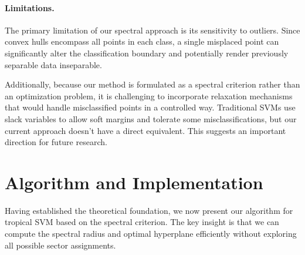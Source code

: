 \documentclass{article}
\begin{document}
\paragraph{Limitations.} 
The primary limitation of our spectral approach is its sensitivity to outliers. Since convex hulls encompass all points in each class, a single misplaced point can significantly alter the classification boundary and potentially render previously separable data inseparable.

Additionally, because our method is formulated as a spectral criterion rather than an optimization problem, it is challenging to incorporate relaxation mechanisms that would handle misclassified points in a controlled way. Traditional SVMs use slack variables to allow soft margins and tolerate some misclassifications, but our current approach doesn't have a direct equivalent. This suggests an important direction for future research.

\section{Algorithm and Implementation}\label{sec:algorithm}

Having established the theoretical foundation, we now present our algorithm for tropical SVM based on the spectral criterion. The key insight is that we can compute the spectral radius and optimal hyperplane efficiently without exploring all possible sector assignments.
\end{document}
